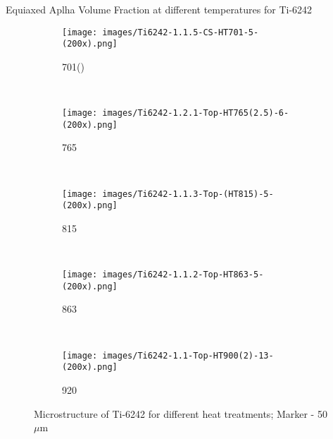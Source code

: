\documentclass[10pt]{beamer}
\begin{document}
\begin{frame}{Equiaxed Aplha Volume Fraction at different temperatures for Ti-6242}
\begin{figure}[H]
    \centering
    \begin{subfigure}{0.25\textwidth}
        \texttt{[image: images/Ti6242-1.1.5-CS-HT701-5-(200x).png]}
        \caption{701\degC ()}
        \label{fig:Ti-6242 HT700}
    \end{subfigure}    
    ~
    \begin{subfigure}{0.25\textwidth}
        \texttt{[image: images/Ti6242-1.2.1-Top-HT765(2.5)-6-(200x).png]}
        \caption{765\degC}
        \label{fig:Ti-6242 HT752}
    \end{subfigure}   
   \\
    \begin{subfigure}{0.25\textwidth}
        \texttt{[image: images/Ti6242-1.1.3-Top-(HT815)-5-(200x).png]}
        \caption{815\degC}
        \label{fig:Ti-6242 HT815}
    \end{subfigure}
    ~
    \begin{subfigure}{0.25\textwidth}
        \texttt{[image: images/Ti6242-1.1.2-Top-HT863-5-(200x).png]}
        \caption{863\degC}
        \label{fig:Ti-6242 HT863}
    \end{subfigure}
    ~
    \begin{subfigure}{0.25\textwidth}
        \texttt{[image: images/Ti6242-1.1-Top-HT900(2)-13-(200x).png]}
        \caption{920\degC}
        \label{fig:Ti-6242 HT920}
    \end{subfigure}        
   
    \caption{Microstructure of Ti-6242 for different heat treatments; Marker - 50$\mu$m}
    
\end{figure}
\end{frame}




\begin{frame}{Equiaxed Aplha Volume Fraction at different temperatures for Ti-6242}
\begin{figure}[H]
    \centering
        \texttt{[image: \\HeatTreatment\{Voulme\_Fraction.eps]}}
        \caption{Volume Fraction at different temperatures for Ti-6242}
\end{figure}
\end{frame}
\end{document}
